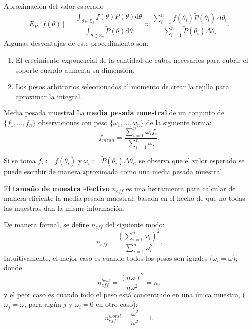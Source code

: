 \documentclass{beamer}
\begin{document}
\begin{frame}[allowframebreaks]{Aproximación del valor esperado}
		$$E_P[f(\theta)]=\frac{\int_{\theta\in\mathbb{S}_\theta} f(\theta)\tilde{P}(\theta)\mathrm{d}\theta}{\int_{\theta\in\mathbb{S}_\theta} \tilde{P}(\theta)\mathrm{d}\theta}\approx \frac{\sum_{i=1}^nf(\overline{\theta_i})\tilde{P}(\overline{\theta_i})\Delta \theta_i}{\sum_{i=1}^n \tilde{P}(\overline{\theta_i})\Delta \theta_i}.$$
		Algunas desventajas de este procedimiento son:
		\begin{enumerate}
			\item El crecimiento exponencial de la cantidad de cubos necesarios para cubrir el soporte cuando aumenta su dimensión.
			\item Los pesos arbitrarios seleccionados al momento de crear la rejilla para aproximar la integral.
		\end{enumerate}
	\end{frame}
	
	\begin{frame}[allowframebreaks]{Media pesada muestral}
	La \textbf{media pesada muestral} de un conjunto de $\{f_1,\dots,f_n\}$ observaciones con peso $\{\omega_1,\dots,\omega_n\}$ de la siguiente forma:
		\begin{equation}
			f_{mean}=\frac{\sum_{i=1}^n \omega_i f_i}{\sum_{i=1}^n\omega_i}.
\end{equation}			

Si se toma $f_i:=f(\overline{\theta_i})$ y $\omega_i:=\tilde{P}(\overline{\theta_i})\Delta \theta_i$, se observa que el valor esperado se puede escribir de manera aproximada como una media pesada muestral.

El \textbf{tamaño de muestra efectivo} $n_{eff}$ es una herramienta para calcular de manera eficiente la media pesada muestral, basada en el hecho de que no todas las muestras dan la misma información. 

De manera formal, se define $n_{eff}$ del siguiente modo\cite{kish_1995}:
	\begin{equation}
		n_{eff}=\frac{\left(\sum_{i=1}^n \omega_i \right)^2}{\sum_{i=1}^n\omega_i^2}.
	\end{equation}
	Intuitivamente, el mejor caso es cuando todos los pesos son iguales ($\omega_i=\omega$), donde
	$$n^{best}_{eff}=\frac{(n\omega)^2}{n\omega^2}=n,$$
	y el peor caso es cuando todo el peso está concentrado en una única muestra, ($\omega_j=\omega$, para algún $j$ y $\omega_i=0$ en otro caso):
	$$n^{worst}_{eff}=\frac{\omega^2}{\omega^2}=1.$$
	
	\end{frame}
	
\end{document}
